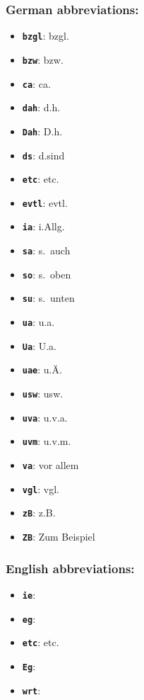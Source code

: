 \documentclass[english]{hgbarticle}
\begin{document}
\subsubsection*{German abbreviations:}

\begin{itemize}
\item \textbf{\texttt{{\bs}bzgl}}: bzgl.
\item \textbf{\texttt{{\bs}bzw}}: bzw.
\item \textbf{\texttt{{\bs}ca}}: ca.
\item \textbf{\texttt{{\bs}dah}}: d.\thinspace{}h.
\item \textbf{\texttt{{\bs}Dah}}: D.\thinspace{}h.
\item \textbf{\texttt{{\bs}ds}}: d.\thinspace{}sind
\item \textbf{\texttt{{\bs}etc}}: etc.
\item \textbf{\texttt{{\bs}evtl}}: evtl.
\item \textbf{\texttt{{\bs}ia}}: i.\thinspace{}Allg.
\item \textbf{\texttt{{\bs}sa}}: s.\ auch
\item \textbf{\texttt{{\bs}so}}: s.\ oben
\item \textbf{\texttt{{\bs}su}}: s.\ unten
\item \textbf{\texttt{{\bs}ua}}: u.\thinspace{}a.
\item \textbf{\texttt{{\bs}Ua}}: U.\thinspace{}a.
\item \textbf{\texttt{{\bs}uae}}: u.\thinspace{}\"A.
\item \textbf{\texttt{{\bs}usw}}: usw.
\item \textbf{\texttt{{\bs}uva}}: u.\thinspace{}v.\thinspace{}a.
\item \textbf{\texttt{{\bs}uvm}}: u.\thinspace{}v.\thinspace{}m.
\item \textbf{\texttt{{\bs}va}}: vor allem
\item \textbf{\texttt{{\bs}vgl}}: vgl.
\item \textbf{\texttt{{\bs}zB}}: z.\thinspace{}B.
\item \textbf{\texttt{{\bs}ZB}}: Zum Beispiel
\end{itemize}

\subsubsection*{English abbreviations:}

\begin{itemize}
\item \textbf{\texttt{{\bs}ie}}: \ie
\item \textbf{\texttt{{\bs}eg}}: \eg
\item \textbf{\texttt{{\bs}etc}}: etc.
\item \textbf{\texttt{{\bs}Eg}}: \Eg
\item \textbf{\texttt{{\bs}wrt}}: \wrt
\end{itemize}
\end{document}
